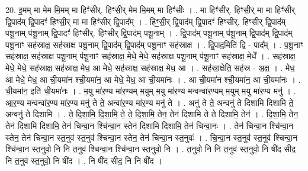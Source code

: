 \documentclass[17pt]{extarticle}
\begin{document}
20. इ॒मम् मा मेम मि॒मम् मा हिꣳ॑सीर्. हिꣳसी॒र् मेम मि॒मम् मा हिꣳ॑सीः । . मा हिꣳ॑सीर्. हिꣳसी॒र् मा मा हिꣳ॑सीर् द्वि॒पाद॑म् द्वि॒पादꣳ॑ हिꣳसी॒र् मा मा हिꣳ॑सीर् द्वि॒पाद᳚म् । . हिꣳ॒॒सी॒र् द्वि॒पाद॑म् द्वि॒पादꣳ॑ हिꣳसीर्. हिꣳसीर् द्वि॒पाद॑म् पशू॒नाम् प॑शू॒नाम् द्वि॒पादꣳ॑ हिꣳसीर्. हिꣳसीर् द्वि॒पाद॑म् पशू॒नाम् । . द्वि॒पाद॑म् पशू॒नाम् प॑शू॒नाम् द्वि॒पाद॑म् द्वि॒पाद॑म् पशू॒नाꣳ सह॑स्राक्ष॒ सह॑स्राक्ष पशू॒नाम् द्वि॒पाद॑म् द्वि॒पाद॑म् पशू॒नाꣳ सह॑स्राक्ष । . द्वि॒पाद॒मिति॑ द्वि - पाद᳚म् । . प॒शू॒नाꣳ सह॑स्राक्ष॒ सह॑स्राक्ष पशू॒नाम् प॑शू॒नाꣳ सह॑स्राक्ष॒ मेधे॒ मेधे॒ सह॑स्राक्ष पशू॒नाम् प॑शू॒नाꣳ सह॑स्राक्ष॒ मेधे᳚ । . सह॑स्राक्ष॒ मेधे॒ मेधे॒ सह॑स्राक्ष॒ सह॑स्राक्ष॒ मेध॒ आ मेधे॒ सह॑स्राक्ष॒ सह॑स्राक्ष॒ मेध॒ आ । . सह॑स्रा॒क्षेति॒ सह॑स्र - अ॒क्ष॒ । . मेध॒ आ मेधे॒ मेध॒ आ ची॒यमा॑न श्ची॒यमा॑न॒ आ मेधे॒ मेध॒ आ ची॒यमा॑नः । . आ ची॒यमा॑न श्ची॒यमा॑न॒ आ ची॒यमा॑नः । . ची॒यमा॑न॒ इति॑ ची॒यमा॑नः । . म॒यु मा॑र॒ण्य मा॑र॒ण्यम् म॒युम् म॒यु मा॑र॒ण्य मन्वन्वा॑र॒ण्यम् म॒युम् म॒यु मा॑र॒ण्य मनु॑ । . आ॒र॒ण्य मन्वन्वा॑र॒ण्य मा॑र॒ण्य मनु॑ ते ते॒ अन्वा॑र॒ण्य मा॑र॒ण्य मनु॑ ते । . अनु॑ ते ते॒ अन्वनु॑ ते दिशामि दिशामि ते॒ अन्वनु॑ ते दिशामि । . ते॒ दि॒शा॒मि॒ दि॒शा॒मि॒ ते॒ ते॒ दि॒शा॒मि॒ तेन॒ तेन॑ दिशामि ते ते दिशामि॒ तेन॑ । . दि॒शा॒मि॒ तेन॒ तेन॑ दिशामि दिशामि॒ तेन॑ चिन्वा॒न श्चि॑न्वा॒न स्तेन॑ दिशामि दिशामि॒ तेन॑ चिन्वा॒नः । . तेन॑ चिन्वा॒न श्चि॑न्वा॒न स्तेन॒ तेन॑ चिन्वा॒न स्त॒नुव॑ स्त॒नुव॑ श्चिन्वा॒न स्तेन॒ तेन॑ चिन्वा॒न स्त॒नुवः॑ । . चि॒न्वा॒न स्त॒नुव॑ स्त॒नुव॑ श्चिन्वा॒न श्चि॑न्वा॒न स्त॒नुवो॒ नि नि त॒नुव॑ श्चिन्वा॒न श्चि॑न्वा॒न स्त॒नुवो॒ नि । . त॒नुवो॒ नि नि त॒नुव॑ स्त॒नुवो॒ नि षी॑द सीद॒ नि त॒नुव॑ स्त॒नुवो॒ नि षी॑द । . नि षी॑द सीद॒ नि नि षी॑द । \newline
\end{document}
